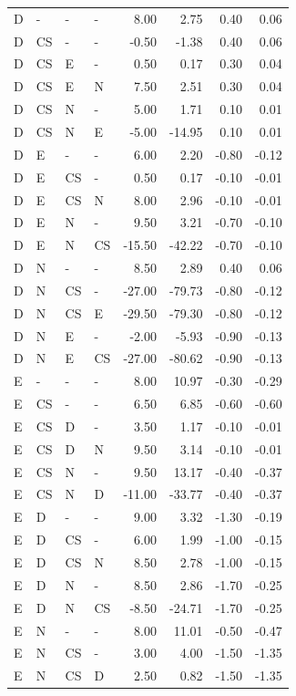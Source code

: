 \documentclass[journal]{IEEEtran}
\begin{document}
\begin{table}[h!t]
\begin{tabular*}{\textwidth}{@{\extracolsep{\fill}} l l l l r r r r @{}}
D & - & - & - & 8.00 & 2.75 & 0.40 & 0.06 \\
D & CS & - & - & -0.50 & -1.38 & 0.40 & 0.06 \\
D & CS & E & - & 0.50 & 0.17 & 0.30 & 0.04 \\
D & CS & E & N & 7.50 & 2.51 & 0.30 & 0.04 \\
D & CS & N & - & 5.00 & 1.71 & 0.10 & 0.01 \\
D & CS & N & E & -5.00 & -14.95 & 0.10 & 0.01 \\
D & E & - & - & 6.00 & 2.20 & -0.80 & -0.12 \\
D & E & CS & - & 0.50 & 0.17 & -0.10 & -0.01 \\
D & E & CS & N & 8.00 & 2.96 & -0.10 & -0.01 \\
D & E & N & - & 9.50 & 3.21 & -0.70 & -0.10 \\
D & E & N & CS & -15.50 & -42.22 & -0.70 & -0.10 \\
D & N & - & - & 8.50 & 2.89 & 0.40 & 0.06 \\
D & N & CS & - & -27.00 & -79.73 & -0.80 & -0.12 \\
D & N & CS & E & -29.50 & -79.30 & -0.80 & -0.12 \\
D & N & E & - & -2.00 & -5.93 & -0.90 & -0.13 \\
D & N & E & CS & -27.00 & -80.62 & -0.90 & -0.13 \\
E & - & - & - & 8.00 & 10.97 & -0.30 & -0.29 \\
E & CS & - & - & 6.50 & 6.85 & -0.60 & -0.60 \\
E & CS & D & - & 3.50 & 1.17 & -0.10 & -0.01 \\
E & CS & D & N & 9.50 & 3.14 & -0.10 & -0.01 \\
E & CS & N & - & 9.50 & 13.17 & -0.40 & -0.37 \\
E & CS & N & D & -11.00 & -33.77 & -0.40 & -0.37 \\
E & D & - & - & 9.00 & 3.32 & -1.30 & -0.19 \\
E & D & CS & - & 6.00 & 1.99 & -1.00 & -0.15 \\
E & D & CS & N & 8.50 & 2.78 & -1.00 & -0.15 \\
E & D & N & - & 8.50 & 2.86 & -1.70 & -0.25 \\
E & D & N & CS & -8.50 & -24.71 & -1.70 & -0.25 \\
E & N & - & - & 8.00 & 11.01 & -0.50 & -0.47 \\
E & N & CS & - & 3.00 & 4.00 & -1.50 & -1.35 \\
E & N & CS & D & 2.50 & 0.82 & -1.50 & -1.35 \\

\end{tabular*}
\end{table}
\end{document}
